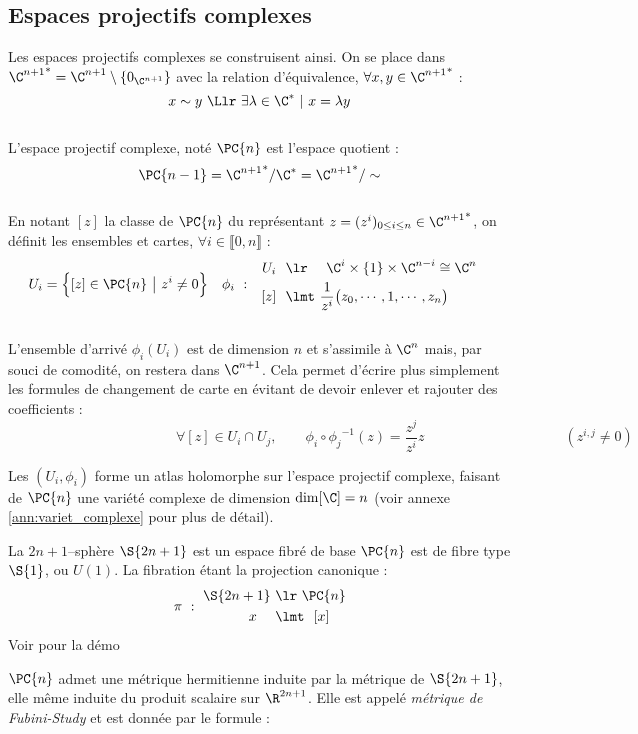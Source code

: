 \subsection{Espaces projectifs complexes}

Les espaces projectifs complexes se construisent ainsi. On se place dans ${\C^{n+1}}^*=\C^{n+1}\setminus\{0_{\C^{n+1}}\}$ avec la relation d'équivalence, $\forall x,y\in{\C^{n+1}}^*$ :
\[x \sim y\ \Llr\ \exists \lambda\in\C^*\ |\ x=\lambda y\]
\\
L'espace projectif complexe, noté $\PC{n}$ est l'espace quotient :
\[\PC{n-1} = {\C^{n+1}}^*/\C^* = {\C^{n+1}}^*/\sim\]
\\
En notant $[z]$ la classe de $\PC{n}$ du représentant $z = (z^i)_{0\leq i\leq n}\in{\C^{n+1}}^*$, on définit les ensembles et cartes, $\forall i\in\llbracket0,n\rrbracket$ :
\begin{align}
	U_i &= \Big\{[z]\in\PC{n}\ \big|\ z^i\neq 0\Big\}  &  \phi_i\  :\quad &\begin{aligned}
		U_i\ \ &\lr\quad\ \C^{i}\times \{1\} \times\C^{n-i}\cong \C^{n} \\ [z]\ \ &\lmt\ \frac{1}{z^i}\big(z_0,\cdots, 1,\cdots, z_n\big)
	\end{aligned}
\end{align}
\\
L'ensemble d'arrivé $\phi_i(U_i)$ est de dimension $n$ et s'assimile à $\C^{n}$ mais, par souci de comodité, on restera dans $\C^{n+1}$. Cela permet  d'écrire plus simplement les formules de changement de carte en évitant de devoir enlever et rajouter des coefficients :
\[\qquad\qquad\qquad\qquad\qquad\qquad \forall [z]\in U_i\cap U_j,\qquad \phi_i \circ {\phi_j}^{-1}(z) = \frac{z^j}{z^i}z\qquad\qquad\qquad\qquad\qquad (z^{i,j}\neq 0) \qquad\]

Les $(U_i,\phi_i)$ forme un atlas holomorphe sur l'espace projectif complexe, faisant de $\PC{n}$ une variété complexe de dimension $\dim[\C] = n$ (voir annexe \ref{ann:variet_complexe} pour plus de détail).

\begin{proposition}
	La $2n+1$--sphère $\S{2n+1}$ est un espace fibré de base $\PC{n}$ est de fibre type $\S{1}$, ou $U(1)$. La fibration étant la projection canonique :
	\[\pi\ :\ \begin{aligned}\S{2n+1}\ &\lr\ \PC{n} \\ x\quad\ &\lmt\ \ [x]\end{aligned}\]
	Voir \cite{lafontaine_introduction_2015} pour la démo
\end{proposition}


\begin{proposition}
	$\PC{n}$ admet une métrique hermitienne induite par la métrique de $\S{2n+1}$, elle même induite du produit scalaire sur $\R^{2n+1}$. Elle est appelé \emph{métrique de Fubini-Study} et est donnée par le formule :
	\[\]
\end{proposition}